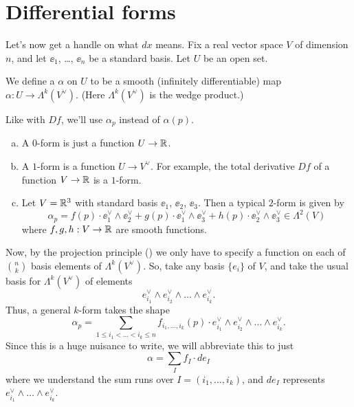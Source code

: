\section{Differential forms}

Let's now get a handle on what $dx$ means.
Fix a real vector space $V$ of dimension $n$,
and let $\ee_1$, \dots, $\ee_n$ be a standard basis.
Let $U$ be an open set.

\begin{definition}
	We define a  $\alpha$ on $U$
	to be a smooth (infinitely differentiable) map
	$\alpha : U \to \Lambda^k(V^\vee)$.
	(Here $\Lambda^k(V^\vee)$ is the wedge product.)
\end{definition}

Like with $Df$, we'll use $\alpha_p$ instead of $\alpha(p)$.

\begin{example}
	[$k$-forms for $k=0,1$]
	\listhack
	\begin{enumerate}[(a)]
		\item A $0$-form is just a function $U \to \mathbb R$.
		\item A $1$-form is a function $U \to V^\vee$.
		For example,
		the total derivative $Df$ of a function $V \to \mathbb R$ is a $1$-form.
		\item Let $V = \mathbb R^3$ with standard basis $\ee_1$, $\ee_2$, $\ee_3$.
		Then a typical $2$-form is given by
		\[
			\alpha_p
			=
			f(p) \cdot \ee_1^\vee \wedge \ee_2^\vee
			+ g(p) \cdot \ee_1^\vee \wedge \ee_3^\vee
			+ h(p) \cdot \ee_2^\vee \wedge \ee_3^\vee
			\in \Lambda^2(V)
		\]
		where $f,g,h : V \to \mathbb R$ are smooth functions.
	\end{enumerate}
\end{example}

Now, by the projection principle () we only have to specify
a function on each of $\binom nk$ basis elements of $\Lambda^k(V^\vee)$.
So, take any basis $\{e_i\}$ of $V$, and 
take the usual basis for $\Lambda^k(V^\vee)$ of elements
\[ e_{i_1}^\vee \wedge e_{i_2}^\vee \wedge \dots \wedge e_{i_k}^\vee. \]
Thus, a general $k$-form takes the shape
\[ \alpha_p = \sum_{1 \le i_1 < \dots < i_k \le n} 
	f_{i_1, \dots, i_k}(p) \cdot
	e_{i_1}^\vee \wedge e_{i_2}^\vee \wedge \dots \wedge e_{i_k}^\vee. \]
Since this is a huge nuisance to write, we will abbreviate this to just
\[ \alpha = \sum_I f_I \cdot de_I \]
where we understand the sum runs over $I = (i_1, \dots, i_k)$,
and $de_I$ represents $e_{i_1}^\vee \wedge \dots \wedge e_{i_k}^\vee$.

